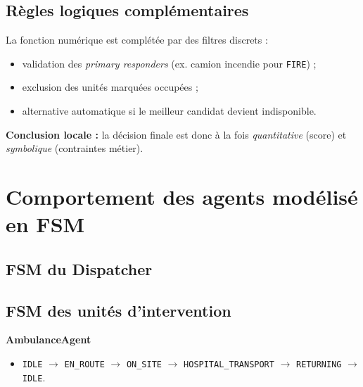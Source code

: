 \documentclass[12pt,a4paper]{article}
\begin{document}
\subsection{R\`egles logiques compl\'ementaires}
La fonction num\'erique est compl\'et\'ee par des filtres discrets :
\begin{itemize}
    \item validation des \textit{primary responders} (ex. camion incendie pour \texttt{FIRE}) ;
    \item exclusion des unit\'es marqu\'ees occup\'ees ;
    \item alternative automatique si le meilleur candidat devient indisponible.
\end{itemize}

\textbf{Conclusion locale :} la d\'ecision finale est donc \`a la fois \textit{quantitative} (score) et \textit{symbolique} (contraintes m\'etier).

\section{Comportement des agents mod\'elis\'e en FSM}
\subsection{FSM du Dispatcher}
\begin{center}
\end{center}

\subsection{FSM des unit\'es d'intervention}
\textbf{AmbulanceAgent}
\begin{itemize}
    \item \texttt{IDLE} $\rightarrow$ \texttt{EN\_ROUTE} $\rightarrow$ \texttt{ON\_SITE} $\rightarrow$ \texttt{HOSPITAL\_TRANSPORT} $\rightarrow$ \texttt{RETURNING} $\rightarrow$ \texttt{IDLE}.
\end{itemize}
\end{document}
